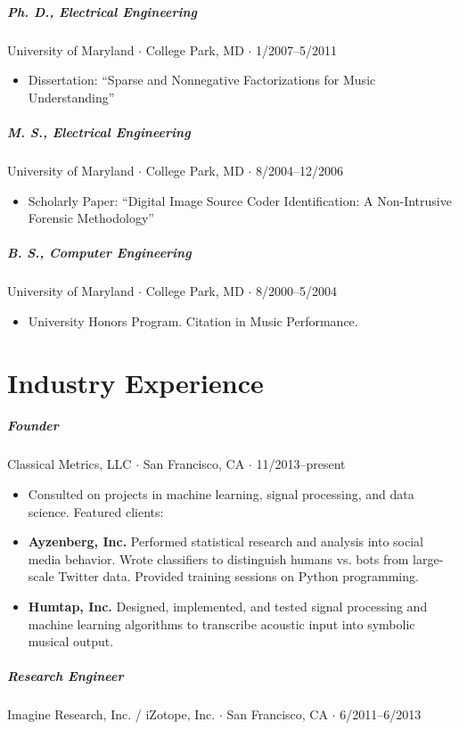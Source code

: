 \documentclass[10pt,letterpaper]{article}
\begin{document}
\subparagraph{Ph. D., Electrical Engineering}
University of Maryland $\cdot$ College Park, MD $\cdot$ 1/2007--5/2011
\begin{itemize}
    \item Dissertation: ``Sparse and Nonnegative Factorizations for Music Understanding''
\end{itemize}

\subparagraph{M. S., Electrical Engineering}
University of Maryland $\cdot$ College Park, MD $\cdot$ 8/2004--12/2006
\begin{itemize}
    \item Scholarly Paper: ``Digital Image Source Coder Identification: A Non-Intrusive Forensic Methodology''
\end{itemize}

\subparagraph{B. S., Computer Engineering}
University of Maryland $\cdot$ College Park, MD $\cdot$ 8/2000--5/2004
\begin{itemize}
    \item University Honors Program.  Citation in Music Performance.
\end{itemize}


\section*{Industry Experience}

\subparagraph{Founder}
Classical Metrics, LLC $\cdot$ San Francisco, CA $\cdot$ 11/2013--present
\begin{itemize}
    \item Consulted on projects in machine learning, signal processing, and data science. Featured clients:
    \item \textbf{Ayzenberg, Inc.} Performed statistical research and analysis into social media behavior. Wrote classifiers to distinguish humans vs. bots from large-scale Twitter data. Provided training sessions on Python programming.
    \item \textbf{Humtap, Inc.} Designed, implemented, and tested signal processing and machine learning algorithms to transcribe acoustic input into symbolic musical output.
\end{itemize}


\subparagraph{Research Engineer}
Imagine Research, Inc. / iZotope, Inc. $\cdot$ San Francisco, CA $\cdot$ 6/2011--6/2013 
\end{document}

